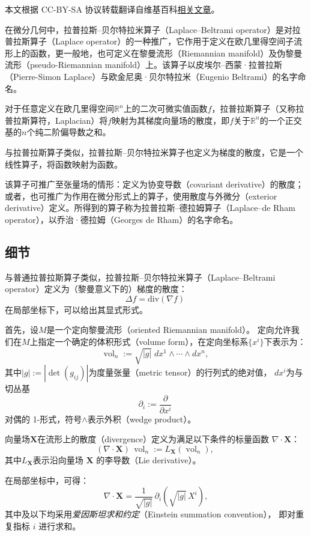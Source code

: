 
本文根据 CC-BY-SA 协议转载翻译自维基百科\href{https://en.wikipedia.org/wiki/Laplace\%E2\%80\%93Beltrami_operator}{相关文章}。

在微分几何中，拉普拉斯–贝尔特拉米算子（Laplace–Beltrami operator）是对拉普拉斯算子（Laplace operator）的一种推广，它作用于定义在欧几里得空间子流形上的函数，更一般地，也可定义在黎曼流形（Riemannian manifold）及伪黎曼流形（pseudo-Riemannian manifold）上。该算子以皮埃尔–西蒙·拉普拉斯（Pierre-Simon Laplace）与欧金尼奥·贝尔特拉米（Eugenio Beltrami）的名字命名。

对于任意定义在欧几里得空间$\mathbb{R}^{n}$上的二次可微实值函数$f$，拉普拉斯算子（又称拉普拉斯算符，Laplacian）将$f$映射为其梯度向量场的散度，即$f$关于$\mathbb{R}^{n}$的一个正交基的$n$个纯二阶偏导数之和。

与拉普拉斯算子类似，拉普拉斯–贝尔特拉米算子也定义为梯度的散度，它是一个线性算子，将函数映射为函数。

该算子可推广至张量场的情形：定义为协变导数（covariant derivative）的散度；或者，也可推广为作用在微分形式上的算子，使用散度与外微分（exterior derivative）定义。所得到的算子称为拉普拉斯–德拉姆算子（Laplace–de Rham operator），以乔治·德拉姆（Georges de Rham）的名字命名。
\subsection{细节}
与普通拉普拉斯算子类似，拉普拉斯–贝尔特拉米算子（Laplace–Beltrami operator）定义为（黎曼意义下的）梯度的散度：
\[
\Delta f = \mathrm{div}(\nabla f)~
\]
在局部坐标下，可以给出其显式形式。

首先，设$M$是一个定向黎曼流形（oriented Riemannian manifold）。
定向允许我们在$M$上指定一个确定的体积形式（volume form），在定向坐标系$\{x^{i}\}$下表示为：
\[
\operatorname{vol}_{n}
:= \sqrt{|g|}\; dx^{1} \wedge \cdots \wedge dx^{n},~
\]
其中$|g| := |\det(g_{ij})|$为度量张量（metric tensor）的行列式的绝对值，
$dx^{i}$为与切丛基
\[
\partial_{i} := \frac{\partial}{\partial x^{i}}~
\]
对偶的 1-形式，符号$\wedge$表示外积（wedge product）。

向量场$\mathbf{X}$在流形上的散度（divergence）定义为满足以下条件的标量函数 $\nabla \cdot \mathbf{X}$：
\[
(\nabla \cdot \mathbf{X}) \, \operatorname{vol}_{n}
:= L_{\mathbf{X}} (\operatorname{vol}_{n}),~
\]
其中$L_{\mathbf{X}}$表示沿向量场 $\mathbf{X}$ 的李导数（Lie derivative）。

在局部坐标中，可得：
\[
\nabla \cdot \mathbf{X}
= \frac{1}{\sqrt{|g|}} \, \partial_{i}
  \left( \sqrt{|g|} \, X^{i} \right),
\]
其中及以下均采用\emph{爱因斯坦求和约定}（Einstein summation convention），
即对重复指标 $i$ 进行求和。

